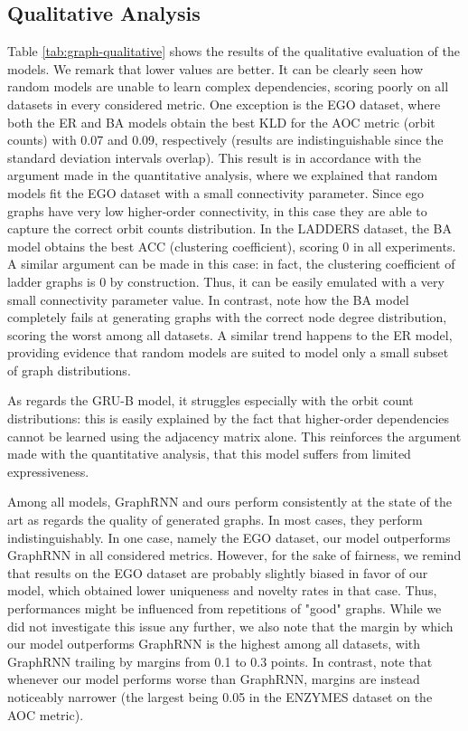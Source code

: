 \subsection{Qualitative Analysis}
Table \ref{tab:graph-qualitative} shows the results of the qualitative evaluation of the models. We remark that lower values are better.
It can be clearly seen how random models are unable to learn complex dependencies, scoring poorly on all datasets in every considered metric. One exception is the EGO dataset, where both the ER and BA models obtain the best KLD for the AOC metric (orbit counts) with 0.07 and 0.09, respectively (results are indistinguishable since the standard deviation intervals overlap). This result is in accordance with the argument made in the quantitative analysis, where we explained that random models fit the EGO dataset with a small connectivity parameter. Since ego graphs have very low higher-order connectivity, in this case they are able to capture the correct orbit counts distribution. In the LADDERS dataset, the BA model obtains the best ACC (clustering coefficient), scoring $0$ in all experiments. A similar argument can be made in this case: in fact, the clustering coefficient of ladder graphs is 0 by construction. Thus, it can be easily emulated with a very small connectivity parameter value. In contrast, note how the BA model completely fails at generating graphs with the correct node degree distribution, scoring the worst among all datasets. A similar trend happens to the ER model, providing evidence that random models are suited to model only a small subset of graph distributions.

As regards the GRU-B model, it struggles especially with the orbit count distributions: this is easily explained by the fact that higher-order dependencies cannot be learned using the adjacency matrix alone. This reinforces the argument made with the quantitative analysis, \ie that this model suffers from limited expressiveness.

Among all models, GraphRNN and ours perform consistently at the state of the art as regards the quality of generated graphs. In most cases, they perform indistinguishably. In one case, namely the EGO dataset, our model outperforms GraphRNN in all considered metrics. However, for the sake of fairness, we remind that results on the EGO dataset are probably slightly biased in favor of our model, which obtained lower uniqueness and novelty rates in that case. Thus, performances might be influenced from repetitions of "good" graphs. While we did not investigate this issue any further, we also note that the margin by which our model outperforms GraphRNN is the highest among all datasets, with GraphRNN trailing by margins from 0.1 to 0.3 points. In contrast, note that whenever our model performs worse than GraphRNN, margins are instead noticeably narrower (the largest being 0.05 in the ENZYMES dataset on the AOC metric).

